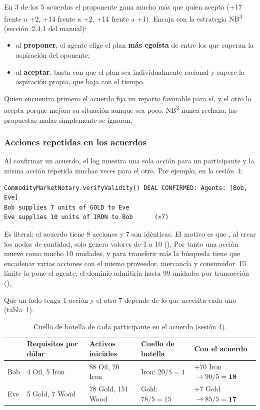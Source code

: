 En 3 de los 5 acuerdos el proponente gana mucho más que quien acepta (+17 frente a +2, +14 frente a
+2, +14 frente a +1). Encaja con la estrategia NB\textsuperscript{3} (sección~2.4.1 del manual):

\begin{itemize}
  \item al \textbf{proponer}, el agente elige el plan \textbf{más egoísta} de entre los que superan
        la aspiración del oponente;
  \item al \textbf{aceptar}, basta con que el plan sea individualmente racional y supere la
        aspiración propia, que baja con el tiempo.
\end{itemize}

Quien encuentra primero el acuerdo fija un reparto favorable para sí, y el otro lo acepta porque
mejora su situación aunque sea poco. NB\textsuperscript{3} nunca rechaza: las propuestas malas
simplemente se ignoran.

\subsubsection{Acciones repetidas en los acuerdos}
\label{sec:ej1-repetidas}

Al confirmar un acuerdo, el log muestra una sola acción para un participante y la misma acción
repetida muchas veces para el otro. Por ejemplo,  en la sesión~4:

\begin{lstlisting}
CommodityMarketNotary.verifyValidity() DEAL CONFIRMED: Agents: [Bob, Eve]
Bob supplies 7 units of GOLD to Eve
Eve supplies 10 units of IRON to Bob      (×7)
\end{lstlisting}

Es literal: el acuerdo tiene 8 acciones y 7 son idénticas. El motivo es que ,
al crear los nodos de cantidad, solo genera valores de 1 a 10 (). Por tanto
una acción mueve como mucho 10 unidades, y para transferir más la búsqueda tiene que encadenar varias
acciones con el mismo proveedor, mercancía y consumidor. El límite lo pone el agente; el dominio
admitiría hasta 99 unidades por transacción ().

Que un lado tenga 1 acción y el otro 7 depende de lo que necesita cada uno
(tabla~\ref{tab:ej1-cuello}).

\begin{table}[htbp]
  \centering
  \small
  \caption{Cuello de botella de cada participante en el acuerdo  (sesión 4).}
  \label{tab:ej1-cuello}
  \begin{tabular}{lllll}
    \toprule
        & Requisitos por dólar & Activos iniciales & Cuello de botella & Con el acuerdo \\
    \midrule
    Bob & 4 Oil, 5 Iron  & 88 Oil, 20 Iron  & Iron: $20/5 = 4$  & +70 Iron $\rightarrow 90/5 = \mathbf{18}$ \\
    Eve & 5 Gold, 7 Wood & 78 Gold, 151 Wood & Gold: $78/5 = 15$ & +7 Gold $\rightarrow 85/5 = \mathbf{17}$  \\
    \bottomrule
  \end{tabular}
\end{table}


